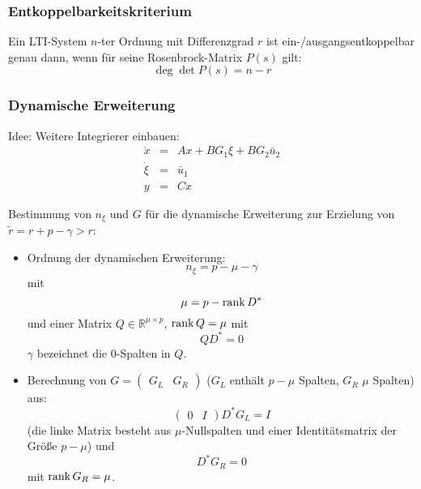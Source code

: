 \subsubsection{Entkoppelbarkeitskriterium}
Ein LTI-System $n$-ter Ordnung mit Differenzgrad $r$ ist ein-/ausgangsentkoppelbar genau
dann, wenn für seine Rosenbrock-Matrix $P(s)$ gilt:
\begin{equation}
    \deg \det P(s) = n-r
\end{equation}

\subsubsection{Dynamische Erweiterung}
Idee: Weitere Integrierer einbauen:
\begin{eqnarray}
    \dot{x} &=& Ax + BG_1 \xi + B G_2 \bar{u}_2 \\
    \dot{\xi} &=& \bar{u}_1 \\
    y &=& Cx
\end{eqnarray}

Bestimmung von $n_\xi$ und $G$ für die dynamische Erweiterung zur Erzielung von
$\tilde{r} = r+p-\gamma > r$:
\begin{itemize}
    \item Ordnung der dynamischen Erweiterung:
        \begin{equation}
            n_\xi = p - \mu - \gamma
        \end{equation}
        mit
        \begin{equation}
            \mu = p - \operatorname*{rank} D^*
        \end{equation}
        und einer Matrix $Q \in \mathbb{R}^{\mu \times p}$, $\operatorname*{rank} Q = \mu$ mit
        \begin{equation}
            Q D^* = 0
        \end{equation}
        $\gamma$ bezeichnet die $0$-Spalten in $Q$.
    \item Berechnung von $G=\begin{pmatrix}G_L & G_R\end{pmatrix}$ ($G_L$ enthält $p-\mu$ Spalten,
        $G_R$ $\mu$ Spalten) aus:
        \begin{equation}
            \begin{pmatrix} 0 & I \end{pmatrix} D^* G_L = I
        \end{equation}
        (die linke Matrix besteht aus $\mu$-Nullspalten und einer Identitätsmatrix
        der Größe $p-\mu$) und
        \begin{equation}
            D^* G_R = 0
        \end{equation}
        mit $\operatorname*{rank} G_R = \mu$.
\end{itemize} 

